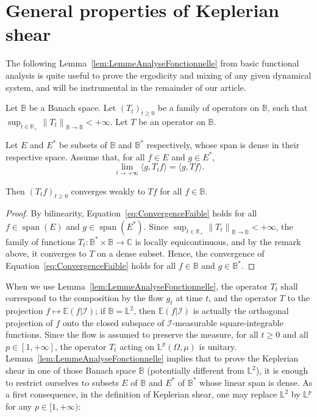 \documentclass[AHL,Unicode,longabstracts]{cedram}
\DeclareMathOperator{\VectSpan}{span}
\newcommand{\R}{\mathbb{R}}
\newcommand{\Cbb}{\mathbb{C}}
\newcommand{\B}{\mathbb{B}}
\newcommand{\Ebb}{\mathbb{E}}
\newcommand{\Lbb}{\mathbb{L}}
\newcommand{\Ical}{\mathcal{I}}
\newcommand{\norm}[2]{\left\| #1 \right\|_{#2}}
\begin{document}
\section{General properties of Keplerian shear}\label{sec:ProprietesFondamentales}

The following Lemma~\ref{lem:LemmeAnalyseFonctionnelle} from basic functional analysis is quite useful to prove the ergodicity and mixing of any given dynamical system, and will be instrumental in the remainder of our article.

\begin{lemm}\label{lem:LemmeAnalyseFonctionnelle}

Let $\B$ be a Banach space. Let $(T_t)_{t \geq 0}$ be a family of operators on $\B$, such that $\sup_{t \in \R_+} \norm{T_t}{\B \to \B} < + \infty$. Let $T$ be an operator on $\B$.

Let $E$ and $E^*$ be subsets of $\B$ and $\B^*$ respectively, whose span is dense in their respective space. Assume that, for all $f \in E$ and $g \in E^*$,
\begin{equation}\label{eq:ConvergenceFaible}
\lim_{t \to + \infty} \langle g, T_t f \rangle = \langle g, T f \rangle.
\end{equation}

Then $(T_t f)_{t \geq 0}$ converges weakly to $T f$ for all $f \in \B$.
\end{lemm}


\begin{proof}%
By bilinearity, Equation~\eqref{eq:ConvergenceFaible} holds for all $f \in \VectSpan(E)$ and $g \in \VectSpan(E^*)$.
Since $\sup_{t \in \R_+} \norm{T_t}{\B \to \B} < + \infty$, the family of functions $T_t : \B^* \times \B \to \Cbb$ is locally equicontinuous, and by the remark above, it converges to $T$ on a dense subset. Hence, the convergence of Equation~\eqref{eq:ConvergenceFaible} holds for all $f \in \B$ and $g \in \B^*$.
\end{proof}



When we use Lemma~\ref{lem:LemmeAnalyseFonctionnelle}, the operator $T_t$ shall correspond to the composition by the flow $g_t$ at time $t$, and the operator $T$ to the projection $f \mapsto \Ebb (f | \Ical)$; if $\B = \Lbb^2$, then $\Ebb (f | \Ical)$ is actually the orthogonal projection of $f$ onto the closed subspace of $\Ical$-measurable square-integrable functions. Since the flow is assumed to preserve the measure, for all $t \geq 0$ and all $p \in [1, + \infty]$, the operator $T_t$ acting on $\Lbb^p (\Omega, \mu)$ is unitary. Lemma~\ref{lem:LemmeAnalyseFonctionnelle} implies that to prove the Keplerian shear in one of those Banach space $\B$ (potentially different from $\Lbb^2$), it is enough to restrict ourselves to subsets $E$ of $\B$ and $E^*$ of $\B^*$ whose linear span is dense. As a first consequence, in the definition of Keplerian shear, one may replace $\Lbb^2$ by $\Lbb^p$ for any $p \in [1, +\infty)$:
\end{document}
